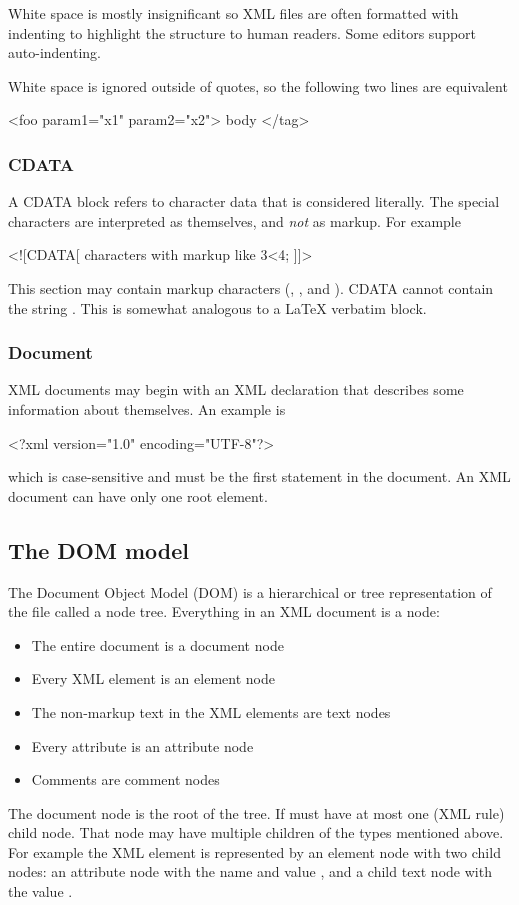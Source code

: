 White space is mostly insignificant so XML files are often formatted with indenting to highlight the structure to human readers.  Some
editors support auto-indenting.

White space is ignored outside of quotes, so the following two lines are equivalent
\begin{XML}
<foo param1="x1" param2="x2"> body </tag>
\end{XML}

\subsubsection{CDATA}
A CDATA block refers to character data that is considered literally. The special characters are interpreted as themselves, and \textit{not} as markup. 
For example
\begin{XML}
<![CDATA[
   characters with markup like 3<4;
]]>
\end{XML}
This section may contain markup characters (\xml{<}, \xml{>}, and \xml{\&}).  CDATA cannot contain the string \xml{"]]>"}.
This is somewhat analogous to a LaTeX verbatim block.


\subsubsection{Document}
XML documents may begin with an XML declaration that describes some information about themselves. An example is 
\begin{XML}
<?xml version="1.0" encoding="UTF-8"?>
\end{XML}
which is case-sensitive and must be the first statement in the document.
An XML document can have only one root element. 

\subsection{The DOM model}
The Document Object Model (DOM) is a hierarchical or tree representation of the file called a node tree.
Everything in an XML document is a node:
\begin{itemize}
\item The entire document is a document node
\item Every XML element is an element node
\item The non-markup text in the XML elements are text nodes
\item Every attribute is an attribute node
\item Comments are comment nodes
\end{itemize}
The document node is the root of the tree.  If must have at most one (XML rule) child node.  That node may have multiple children of the types mentioned above.
For example the XML element  is represented by an element node  with two child nodes:
an attribute node with the name  and value , and a child text node with the value .

